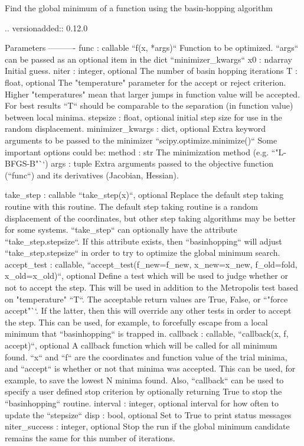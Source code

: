 \begin{DoxyVerb}Find the global minimum of a function using the basin-hopping algorithm

.. versionadded:: 0.12.0

Parameters
----------
func : callable ``f(x, *args)``
    Function to be optimized.  ``args`` can be passed as an optional item
    in the dict ``minimizer_kwargs``
x0 : ndarray
    Initial guess.
niter : integer, optional
    The number of basin hopping iterations
T : float, optional
    The "temperature" parameter for the accept or reject criterion.  Higher
    "temperatures" mean that larger jumps in function value will be
    accepted.  For best results ``T`` should be comparable to the
    separation
    (in function value) between local minima.
stepsize : float, optional
    initial step size for use in the random displacement.
minimizer_kwargs : dict, optional
    Extra keyword arguments to be passed to the minimizer
    ``scipy.optimize.minimize()`` Some important options could be:
        method : str
            The minimization method (e.g. ``"L-BFGS-B"``)
        args : tuple
            Extra arguments passed to the objective function (``func``) and
            its derivatives (Jacobian, Hessian).

take_step : callable ``take_step(x)``, optional
    Replace the default step taking routine with this routine.  The default
    step taking routine is a random displacement of the coordinates, but
    other step taking algorithms may be better for some systems.
    ``take_step`` can optionally have the attribute ``take_step.stepsize``.
    If this attribute exists, then ``basinhopping`` will adjust
    ``take_step.stepsize`` in order to try to optimize the global minimum
    search.
accept_test : callable, ``accept_test(f_new=f_new, x_new=x_new, f_old=fold, x_old=x_old)``, optional
    Define a test which will be used to judge whether or not to accept the
    step.  This will be used in addition to the Metropolis test based on
    "temperature" ``T``.  The acceptable return values are True,
    False, or ``"force accept"``.  If the latter, then this will
    override any other tests in order to accept the step.  This can be
    used, for example, to forcefully escape from a local minimum that
    ``basinhopping`` is trapped in.
callback : callable, ``callback(x, f, accept)``, optional
    A callback function which will be called for all minimum found.  ``x``
    and ``f`` are the coordinates and function value of the trial minima,
    and ``accept`` is whether or not that minima was accepted.  This can be
    used, for example, to save the lowest N minima found.  Also,
    ``callback`` can be used to specify a user defined stop criterion by
    optionally returning True to stop the ``basinhopping`` routine.
interval : integer, optional
    interval for how often to update the ``stepsize``
disp : bool, optional
    Set to True to print status messages
niter_success : integer, optional
    Stop the run if the global minimum candidate remains the same for this
    number of iterations.



\end{DoxyVerb}

